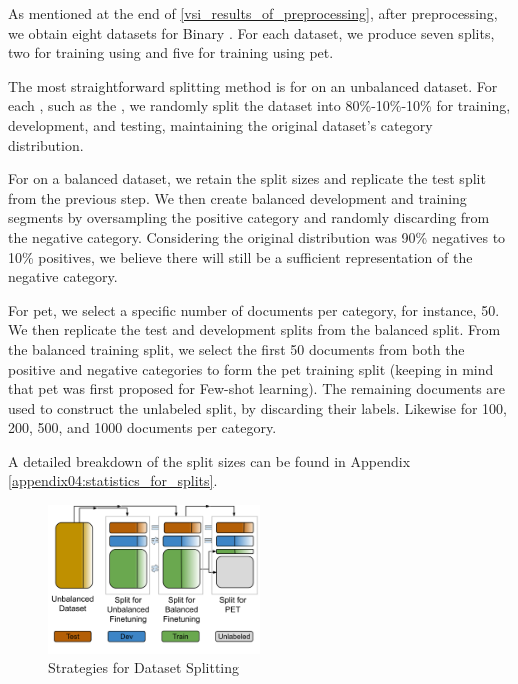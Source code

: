 \label{06_splitting_the_dataset}

As mentioned at the end of \headerName{} \ref{vsi_results_of_preprocessing}, after preprocessing, we obtain eight datasets for Binary \textclassification{}. For each dataset, we produce seven splits, two for training using \finetuning{} and five for training using \gls{pet}.


The most straightforward splitting method is for \finetuning{} on an unbalanced dataset. For each \contentType{}, such as the \translationTitle{}, we randomly split the dataset into 80\%-10\%-10\% for training, development, and testing, maintaining the original dataset's category distribution.

For \finetuning{} on a balanced dataset, we retain the split sizes and replicate the test split from the previous step. 
We then create balanced development and training segments by oversampling the positive category and randomly discarding from the negative category. Considering the original distribution was 90\% negatives to 10\% positives, we believe there will still be a sufficient representation of the negative category.

For \gls{pet}, we select a specific number of documents per category, for instance, 50. We then replicate the test and development splits from the balanced \finetuning{} split. From the balanced \finetuning{} training split, we select the first 50 documents from both the positive and negative categories to form the \gls{pet} training split (keeping in mind that \gls{pet} was first proposed for Few-shot learning). The remaining documents are used to construct the unlabeled split, by discarding their labels. Likewise for 100, 200, 500, and 1000 documents per category.

A detailed breakdown of the split sizes can be found in Appendix \ref{appendix04:statistics_for_splits}.



\begin{figure}
    \centering
    \includegraphics[width=0.5\textwidth]{Figures/06/06_dataset_splits.png}
    \caption{Strategies for Dataset Splitting}
    \label{fig:06_strategies_for_dataset_splitting}
\end{figure}